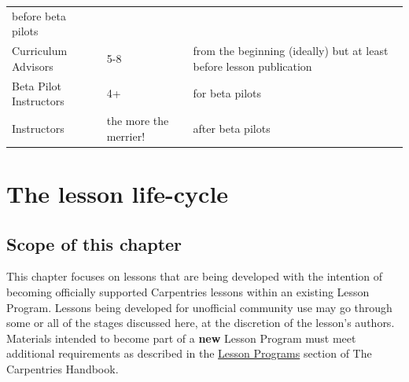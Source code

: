\documentclass[
]{book}
\begin{document}
\begin{longtable}[]{@{}lll@{}}
\begin{minipage}[t]{0.33\columnwidth}
before beta pilots\strut
\end{minipage}\tabularnewline
\begin{minipage}[t]{0.18\columnwidth}\raggedright
Curriculum Advisors\strut
\end{minipage} & \begin{minipage}[t]{0.40\columnwidth}\raggedright
5-8\strut
\end{minipage} & \begin{minipage}[t]{0.33\columnwidth}\raggedright
from the beginning (ideally) but at least before lesson publication\strut
\end{minipage}\tabularnewline
\begin{minipage}[t]{0.18\columnwidth}\raggedright
Beta Pilot Instructors\strut
\end{minipage} & \begin{minipage}[t]{0.40\columnwidth}\raggedright
4+\strut
\end{minipage} & \begin{minipage}[t]{0.33\columnwidth}\raggedright
for beta pilots\strut
\end{minipage}\tabularnewline
\begin{minipage}[t]{0.18\columnwidth}\raggedright
Instructors\strut
\end{minipage} & \begin{minipage}[t]{0.40\columnwidth}\raggedright
the more the merrier!\strut
\end{minipage} & \begin{minipage}[t]{0.33\columnwidth}\raggedright
after beta pilots\strut
\end{minipage}\tabularnewline
\bottomrule
\end{longtable}

\hypertarget{the-lesson-life-cycle}{%
\chapter{The lesson life-cycle}\label{the-lesson-life-cycle}}

\hypertarget{scope-of-this-chapter}{%
\section{Scope of this chapter}\label{scope-of-this-chapter}}

This chapter focuses on lessons that are being developed
with the intention of becoming officially supported
Carpentries lessons within an existing Lesson Program.
Lessons being developed for unofficial community use
may go through some or all of the stages discussed here,
at the discretion of the lesson's authors. Materials
intended to become part of a \textbf{new} Lesson Program
must meet additional requirements as described in
the \href{https://docs.carpentries.org/topic_folders/governance/lesson-program-policy.html}{Lesson Programs} section of
The Carpentries Handbook.
\end{document}
